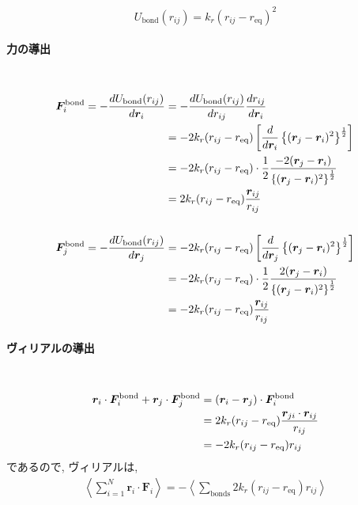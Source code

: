 \begin{equation}
  U_{\mathrm{bond}}(r_{ij}) = k_{r} (r_{ij} - r_{\mathrm{eq}})^{2}
\end{equation}

\paragraph{力の導出} \
\begin{align}
   \bm{F}_{i}^{\mathrm{bond}}
 = 
   -\frac{d U_{\mathrm{bond}}(r_{ij})}{d \bm{r}_{i}}
 \notag
 &= 
    -\frac{d U_{\mathrm{bond}}(r_{ij})}{d r_{ij}}
     \frac{d r_{ij}}{d \bm{r}_{i}}
 \notag \\
 &=
    -2 k_{r} (r_{ij} - r_{\mathrm{eq}})
    \left[
           \frac{d}{d \bm{r}_{i}}
           \left\{ ( \bm{r}_{j} - \bm{r}_{i} )^{2} \right\}^{\frac{1}{2}}
    \right]
 \notag \\
 &=
   -2 k_{r} (r_{ij} - r_{\mathrm{eq}})
    \cdot
    \frac{1}{2}
    \frac{ -2 (\bm{r}_{j} - \bm{r}_{i}) }
         { \left\{ ( \bm{r}_{j} - \bm{r}_{i} )^{2} \right\}^{\frac{1}{2}} }
 \notag \\
 &=
    2 k_{r} (r_{ij} - r_{\mathrm{eq}})
    \frac{\bm{r}_{ij}}{r_{ij}}
 \notag \\
 \notag \\
   \bm{F}_{j}^{\mathrm{bond}}
 = 
    - \frac{d U_{\mathrm{bond}}(r_{ij})}{d \bm{r}_{j}}
 \notag
 &=
    -2 k_{r} (r_{ij} - r_{\mathrm{eq}})
    \left[
           \frac{d}{d \bm{r}_{j}}
           \left\{ ( \bm{r}_{j} - \bm{r}_{i} )^{2} \right\}^{\frac{1}{2}}
    \right]
 \notag \\
 &=
    -2 k_{r} (r_{ij} - r_{\mathrm{eq}})
    \cdot
    \frac{1}{2}
    \frac{ 2 (\bm{r}_{j} - \bm{r}_{i}) }
         { \left\{ ( \bm{r}_{j} - \bm{r}_{i} )^{2} \right\}^{\frac{1}{2}} }
 \notag \\
 &=
    - 2 k_{r} (r_{ij} - r_{\mathrm{eq}})
    \frac{\bm{r}_{ij}}{r_{ij}}
 \notag
\end{align}

\paragraph{ヴィリアルの導出}  \
\begin{align}
    \bm{r}_{i} \cdot \bm{F}_{i}^{\mathrm{bond}}
   +\bm{r}_{j} \cdot \bm{F}_{j}^{\mathrm{bond}}
 &=
    (\bm{r}_{i} -\bm{r}_{j} ) \cdot \bm{F}_{i}^{\mathrm{bond}}
 \notag \\
 &=
    2 k_{r} (r_{ij} - r_{\mathrm{eq}})
    \frac{\bm{r}_{ji} \cdot \bm{r}_{ij}}{r_{ij}}
 \notag \\
 &=
    -2 k_{r} (r_{ij} - r_{\mathrm{eq}}) r_{ij}
 \notag
\end{align}
であるので, ヴィリアルは, 
\begin{align}
   \left\langle
   \sum_{i=1}^{N} \bm{r}_{i} \cdot \bm{F}_{i}
   \right\rangle
 =
 - \left\langle
   \sum_{\mathrm{bonds}} 2 k_{r} (r_{ij} - r_{\mathrm{eq}}) r_{ij}
   \right\rangle
\end{align}
\clearpage

